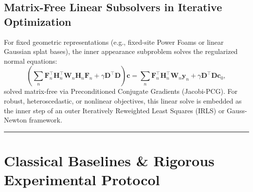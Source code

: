 \documentclass[11pt,a4paper]{article}
\begin{document}
\subsection{Matrix-Free Linear Subsolvers in Iterative Optimization}
For fixed geometric representations (e.g., fixed-site Power Foams or linear Gaussian splat bases), the inner appearance subproblem solves the regularized normal equations:
\begin{equation}
\left( \sum_n \boldsymbol{F}_n^\top \boldsymbol{H}_n^\top \boldsymbol{W}_n \boldsymbol{H}_n \boldsymbol{F}_n + \gamma \boldsymbol{D}^\top \boldsymbol{D} \right) \boldsymbol{c} = \sum_n \boldsymbol{F}_n^\top \boldsymbol{H}_n^\top \boldsymbol{W}_n \boldsymbol{y}_n + \gamma \boldsymbol{D}^\top \boldsymbol{D} \boldsymbol{c}_0,
\end{equation}
solved matrix-free via Preconditioned Conjugate Gradients (Jacobi-PCG). For robust, heteroscedastic, or nonlinear objectives, this linear solve is embedded as the inner step of an outer Iteratively Reweighted Least Squares (IRLS) or Gauss-Newton framework.

\vspace{1em}
\hrule
\vspace{1em}

\section{Classical Baselines \& Rigorous Experimental Protocol}
\end{document}
